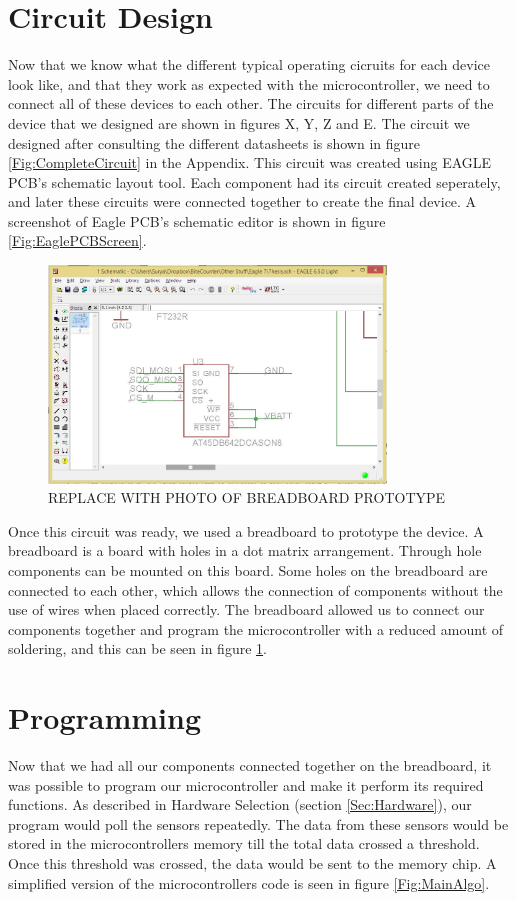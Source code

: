 \section{Circuit Design}
\label{Sec:CircuitDesign}
Now that we know what the different typical operating cicruits for each device look like,
and that they work as expected with the microcontroller,
we need to connect all of these devices to each other.
The circuits for different parts of the device that we designed are shown in figures X, Y, Z and E.
The circuit we designed after consulting the different datasheets is shown in figure \ref{Fig:CompleteCircuit} in the Appendix.
This circuit was created using EAGLE PCB's schematic layout tool.
Each component had its circuit created seperately,
and later these circuits were connected together to create the final device.
A screenshot of Eagle PCB's schematic editor is shown in figure \ref{Fig:EaglePCBScreen}.
\begin{figure}
\begin{center}
\includegraphics[width=0.8\textwidth]{images/EagleScreen.jpg}
\caption{REPLACE WITH PHOTO OF BREADBOARD PROTOTYPE}
\label{Fig:BreadBoardProto}
\end{center}
\end{figure}

Once this circuit was ready, we used a breadboard to prototype the device.
A breadboard is a board with holes in a dot matrix arrangement.
Through hole components can be mounted on this board.
Some holes on the breadboard are connected to each other,
which allows the connection of components without the use of wires when placed correctly.
The breadboard allowed us to connect our components together and program the microcontroller with a reduced amount of soldering, 
and this can be seen in figure \ref{Fig:BreadBoardProto}.

\section{Programming}
\label{Sec:Programming}
Now that we had all our components connected together on the breadboard,
it was possible to program our microcontroller and make it perform its required functions.
As described in Hardware Selection (section \ref{Sec:Hardware}),
our program would poll the sensors repeatedly.
The data from these sensors would be stored in the microcontrollers memory till the total data crossed a threshold.
Once this threshold was crossed, the data would be sent to the memory chip.
A simplified version of the microcontrollers code is seen in figure \ref{Fig:MainAlgo}.


